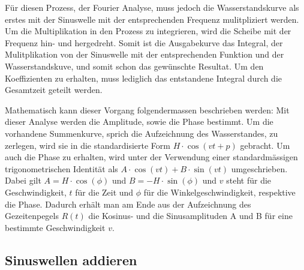 Für diesen Prozess, der Fourier Analyse, muss jedoch die  Wasserstandskurve als erstes mit der Sinuswelle mit der entsprechenden Frequenz mulitpliziert werden.
Um die Multiplikation in den Prozess zu integrieren, wird die Scheibe mit der Frequenz hin- und hergedreht.
Somit ist die Ausgabekurve das Integral, der Mulitplikation von der Sinuswelle mit der entsprechenden Funktion und der Wasserstandskuve, und somit schon das gewünschte Resultat.
Um den Koeffizienten zu erhalten, muss lediglich das entstandene Integral durch die Gesamtzeit geteilt werden.

Mathematisch kann dieser Vorgang folgendermassen beschrieben werden:
Mit dieser Analyse werden die Amplitude, sowie die Phase bestimmt.
Um die vorhandene Summenkurve, sprich die Aufzeichnung des Wasserstandes, zu zerlegen, wird sie in die standardisierte Form $H\cdot\cos(vt+p)$ gebracht.
Um auch die Phase zu erhalten, wird unter der Verwendung einer standardmässigen trigonometrischen Identität als $A\cdot\cos(vt)+B\cdot\sin(vt)$ umgeschrieben.
Dabei gilt $A=H\cdot\cos(\phi)$ und $B=-H\cdot\sin(\phi)$ und $v$ steht für die Geschwindigkeit, $t$ für die Zeit und $\phi$ für die Winkelgeschwindigkeit, respektive die Phase.
Dadurch erhält man am Ende aus der Aufzeichnung des Gezeitenpegels $R(t)$ die Kosinus- und die Sinusamplituden A und B für eine bestimmte Geschwindigkeit $v$.


\subsection{Sinuswellen addieren}

